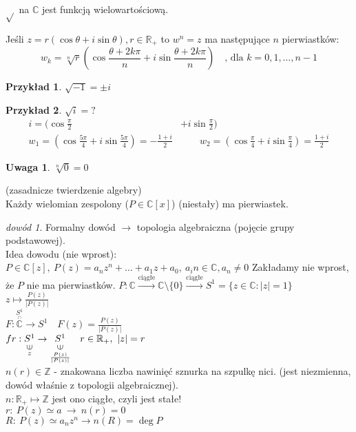\documentclass[10pt]{article}
\newcommand{\vertni}{\rotatebox{90}{$\in$}}
\newcommand{\underscript}[3]{\underset{\scriptstyle{\overset{#2}{#3}}}{#1}}
\newcommand{\overscript}[3]{\overset{\scriptstyle{\underset{#2}{#3}}}{#1}}
\theoremstyle{definition}
\theoremstyle{definition}
\theoremstyle{definition}
\theoremstyle{definition}
\theoremstyle{remark}
\newtheorem*{dd}{dowód}
\theoremstyle{definition}
\newtheorem*{uw}{Uwaga}
\theoremstyle{definition}
\theoremstyle{definition}
\theoremstyle{definition}
\newtheorem*{prz}{Przykład}
\theoremstyle{definition}
\begin{document}
$\sqrt{}$ na $\mathbb{C}$ jest funkcją wielowartościową.
\begin{ft} 
    Jeśli $ z = r(\cos\theta + i\sin\theta), r \in\mathbb{R}_+$ to $w^n=z$ ma następujące $n$ pierwiastków: 
    \[ w_k = \sqrt[n]{r} (\cos\frac{\theta+2k\pi}{n}+i\sin\frac{\theta+2k\pi}{n}) \quad 
    \text{, dla }k = 0,1,\ldots,n-1 \]
\end{ft}
\begin{prz} $\sqrt{-1} = \pm i$ \end{prz} 
\begin{prz} 
    $\sqrt{i} = ?$ 
    \begin{align*}
        i = (\cos\frac{\pi}{2} &+ i\sin\frac{\pi}{2}) \\
        w_1 = (\cos\frac{5\pi}{4} + i\sin\frac{5\pi}{4})=-\frac{1+i}{2} & \qquad  w_2 = (\cos\frac{\pi}{4} + i\sin\frac{\pi}{4}) = \frac{1+i}{2} 
    \end{align*}
\end{prz}
\begin{uw} $\sqrt[n]{0} = 0 $ \end{uw}
\begin{tw} (zasadnicze twierdzenie algebry) \\ 
    Każdy wielomian zespolony ($P \in \mathbb{C}[x]$) (niestały) ma pierwiastek. 
\end{tw} 
\begin{dd}
    Formalny dowód $\rightarrow$ topologia algebraiczna (pojęcie grupy podstawowej). \\ 
    Idea dowodu (nie wprost): \\ 
    $P \in \mathbb{C}[z],\ P(z) = a_n z^n + \ldots + a_1 z + a_0, \ a_in \in \mathbb{C}, a_n \neq 0$
    Zakładamy nie wprost, że $P$ nie ma pierwiastków. 
    $P: \mathbb{C} \xrightarrow{\text{ciągłe}} \mathbb{C} \setminus \{0\} \xrightarrow{\text{ciągłe}} 
    S^1 = \{z \in \mathbb{C} : |z| = 1\}$ \\ 
    $z \mapsto \frac{P(z)}{|P(z)|}$ \\ 
    $F: \overscript{\mathbb{C}}{\cap}{S^1} \to S^1 \quad F(z) = \frac{P(z)}{|P(z)|}$ \\ 
    $fr: \underscript{S^1}{\vertni}{z} \to \underscript{S^1}{\vertni}{\frac{P(z)}{|P(z)|}} \quad
    r \in \mathbb{R}_+,\ |z| = r$ \\
    $n(r) \in \mathbb{Z}$ - znakowana liczba nawinięć sznurka na szpulkę nici. (jest niezmienna, 
    dowód właśnie z topologii algebraicznej). \\ 
    $n : \mathbb{R}_+ \mapsto \mathbb{Z}$ jest ono ciągłe, czyli jest stałe! \\ 
    $r: \ P(z) \simeq a \ \to \ n(r) = 0$ \\ 
    $R: \ P(z) \simeq a_n z^n \to n(R) = \deg P$ \hfill \lightning
\end{dd} 
\end{document}
